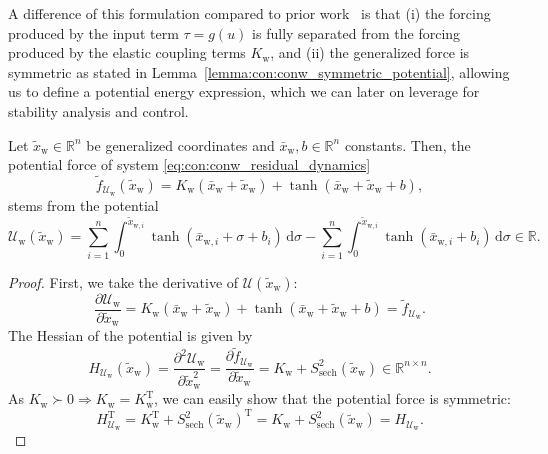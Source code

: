 A difference of this formulation compared to prior work~\cite{rusch2020coupled, rusch2021unicornn, ceni2024random, lanthaler2024neural} is that (i) the forcing produced by the input term $\tau = g(u)$ is fully separated from the forcing produced by the elastic coupling terms $K_\mathrm{w}$, and (ii) the generalized force is symmetric as stated in Lemma~\ref{lemma:con:conw_symmetric_potential}, allowing us to define a potential energy expression, which we can later on leverage for stability analysis and control.

\begin{lemma}\label{lemma:con:conw_symmetric_potential}
    Let $\tilde{x}_\mathrm{w} \in \mathbb{R}^n$ be generalized coordinates and $\bar{x}_\mathrm{w}, b \in \mathbb{R}^n$ constants.
    Then, the potential force of system \eqref{eq:con:conw_residual_dynamics}
    \begin{equation}
        \tilde{f}_{\mathcal{U}_\mathrm{w}}(\tilde{x}_\mathrm{w}) = K_\mathrm{w} (\bar{x}_\mathrm{w} + \tilde{x}_\mathrm{w}) + \tanh(\bar{x}_\mathrm{w} + \tilde{x}_\mathrm{w} + b),
    \end{equation}
    stems from the potential
    \begin{equation}
        \mathcal{U}_\mathrm{w}(\tilde{x}_\mathrm{w}) = \sum_{i=1}^n \int_{0}^{\tilde{x}_{\mathrm{w},i}} \tanh(\bar{x}_{\mathrm{w},i}+\sigma+b_i) \, \mathrm{d} \sigma - \sum_{i=1}^n \int_{0}^{\tilde{x}_{\mathrm{w},i}} \tanh(\bar{x}_{\mathrm{w},i}+b_i) \, \mathrm{d} \sigma \in \mathbb{R}.
    \end{equation}
\end{lemma}
\begin{proof}
    First, we take the derivative of $\mathcal{U}(\tilde{x}_\mathrm{w})$:
    \begin{equation}
        \frac{\partial \mathcal{U}_\mathrm{w}}{\partial \tilde{x}_\mathrm{w}} = K_\mathrm{w} (\bar{x}_\mathrm{w} + \tilde{x}_\mathrm{w}) + \tanh(\bar{x}_\mathrm{w} + \tilde{x}_\mathrm{w} + b) = \tilde{f}_{\mathcal{U}_\mathrm{w}}.
    \end{equation}
    The Hessian of the potential is given by
    \begin{equation}
        H_{\mathcal{U}_\mathrm{w}}(\tilde{x}_\mathrm{w}) = \frac{\partial^2 \mathcal{U}_\mathrm{w}}{\partial \tilde{x}_\mathrm{w}^2} = \frac{\partial \tilde{f}_{\mathcal{U}_\mathrm{w}}}{\partial \tilde{x}_\mathrm{w}}  = K_\mathrm{w} + S_\mathrm{sech}^{2}(\tilde{x}_\mathrm{w}) \in \mathbb{R}^{n \times n}.
    \end{equation}
    As $K_\mathrm{w} \succ 0 \Rightarrow K_\mathrm{w} = K_\mathrm{w}^\mathrm{T}$, we can easily show that the potential force is symmetric:
    \begin{equation}
        H_{\mathcal{U}_\mathrm{w}}^\mathrm{T} = K_\mathrm{w}^\mathrm{T}  + S_\mathrm{sech}^{2}(\tilde{x}_\mathrm{w})^\mathrm{T} = K_\mathrm{w} + S_\mathrm{sech}^{2}(\tilde{x}_\mathrm{w}) = H_{\mathcal{U}_\mathrm{w}}.
    \end{equation}
\end{proof}

